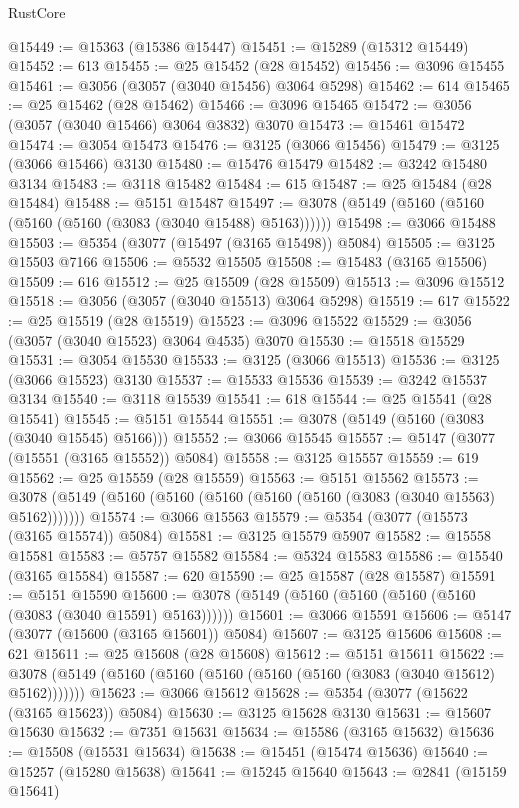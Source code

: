 \begin{lexlean}{RustCore}
\begin{coremodule}
@15449 := @15363 (@15386 @15447)
@15451 := @15289 (@15312 @15449)
@15452 := 613
@15455 := @25 @15452 (@28 @15452)
@15456 := @3096 @15455
@15461 := @3056 (@3057 (@3040 @15456) @3064 @5298)
@15462 := 614
@15465 := @25 @15462 (@28 @15462)
@15466 := @3096 @15465
@15472 := @3056 (@3057 (@3040 @15466) @3064 @3832) @3070
@15473 := @15461 @15472
@15474 := @3054 @15473
@15476 := @3125 (@3066 @15456)
@15479 := @3125 (@3066 @15466) @3130
@15480 := @15476 @15479
@15482 := @3242 @15480 @3134
@15483 := @3118 @15482
@15484 := 615
@15487 := @25 @15484 (@28 @15484)
@15488 := @5151 @15487
@15497 := @3078 (@5149 (@5160 (@5160 (@5160 (@5160 (@3083 (@3040 @15488) @5163))))))
@15498 := @3066 @15488
@15503 := @5354 (@3077 (@15497 (@3165 @15498)) @5084)
@15505 := @3125 @15503 @7166
@15506 := @5532 @15505
@15508 := @15483 (@3165 @15506)
@15509 := 616
@15512 := @25 @15509 (@28 @15509)
@15513 := @3096 @15512
@15518 := @3056 (@3057 (@3040 @15513) @3064 @5298)
@15519 := 617
@15522 := @25 @15519 (@28 @15519)
@15523 := @3096 @15522
@15529 := @3056 (@3057 (@3040 @15523) @3064 @4535) @3070
@15530 := @15518 @15529
@15531 := @3054 @15530
@15533 := @3125 (@3066 @15513)
@15536 := @3125 (@3066 @15523) @3130
@15537 := @15533 @15536
@15539 := @3242 @15537 @3134
@15540 := @3118 @15539
@15541 := 618
@15544 := @25 @15541 (@28 @15541)
@15545 := @5151 @15544
@15551 := @3078 (@5149 (@5160 (@3083 (@3040 @15545) @5166)))
@15552 := @3066 @15545
@15557 := @5147 (@3077 (@15551 (@3165 @15552)) @5084)
@15558 := @3125 @15557
@15559 := 619
@15562 := @25 @15559 (@28 @15559)
@15563 := @5151 @15562
@15573 := @3078 (@5149 (@5160 (@5160 (@5160 (@5160 (@5160 (@3083 (@3040 @15563) @5162)))))))
@15574 := @3066 @15563
@15579 := @5354 (@3077 (@15573 (@3165 @15574)) @5084)
@15581 := @3125 @15579 @5907
@15582 := @15558 @15581
@15583 := @5757 @15582
@15584 := @5324 @15583
@15586 := @15540 (@3165 @15584)
@15587 := 620
@15590 := @25 @15587 (@28 @15587)
@15591 := @5151 @15590
@15600 := @3078 (@5149 (@5160 (@5160 (@5160 (@5160 (@3083 (@3040 @15591) @5163))))))
@15601 := @3066 @15591
@15606 := @5147 (@3077 (@15600 (@3165 @15601)) @5084)
@15607 := @3125 @15606
@15608 := 621
@15611 := @25 @15608 (@28 @15608)
@15612 := @5151 @15611
@15622 := @3078 (@5149 (@5160 (@5160 (@5160 (@5160 (@5160 (@3083 (@3040 @15612) @5162)))))))
@15623 := @3066 @15612
@15628 := @5354 (@3077 (@15622 (@3165 @15623)) @5084)
@15630 := @3125 @15628 @3130
@15631 := @15607 @15630
@15632 := @7351 @15631
@15634 := @15586 (@3165 @15632)
@15636 := @15508 (@15531 @15634)
@15638 := @15451 (@15474 @15636)
@15640 := @15257 (@15280 @15638)
@15641 := @15245 @15640
@15643 := @2841 (@15159 @15641)

\end{coremodule}
\end{lexlean}
